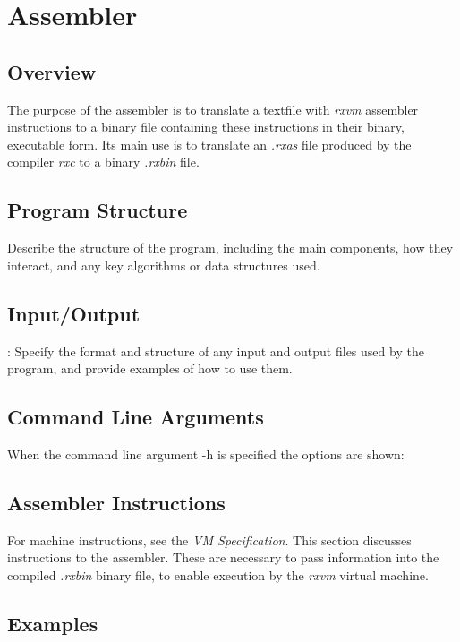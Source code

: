 \chapter{\crexx{} Assembler}
\section{Overview}
The purpose of the \crexx{} assembler is to translate a textfile with
\emph{rxvm} assembler instructions to a binary file containing these
instructions in their binary, executable form. Its main use is to
translate an \emph{.rxas} file produced by the \crexx{} compiler
\emph{rxc} to a binary \emph{.rxbin} file.

\section{Program Structure}

 Describe the structure of the program, including the main components, how they interact, and any key algorithms or data structures used.

\section{Input/Output}

: Specify the format and structure of any input and output files used by the program, and provide examples of how to use them.

\section{Command Line Arguments}
When the command line argument -h is specified the options are shown:\\
\begin{shaded}
  \small
  \obeylines {}
 \end{shaded}
\section{Assembler Instructions}
For machine instructions, see the \emph{\crexx{} VM
  Specification}. This section discusses instructions to the
assembler. These are necessary to pass information into the compiled
\emph{.rxbin} binary file, to enable execution by the \emph{rxvm}
virtual machine.

\section{Examples}


